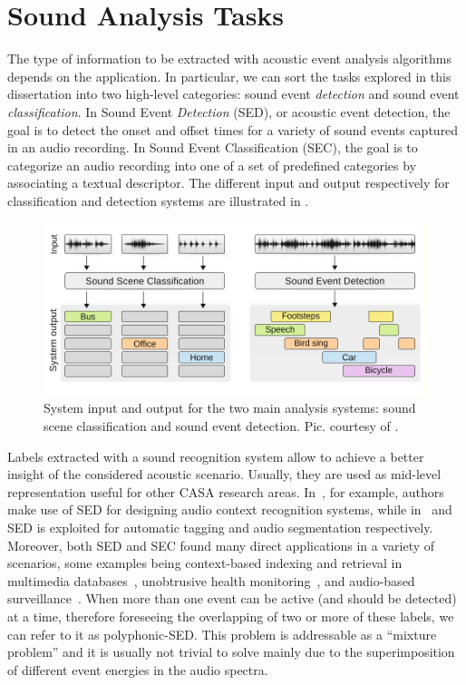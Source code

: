 \section{Sound Analysis Tasks}
The type of information to be extracted with acoustic event analysis algorithms depends on the application. In particular, we can sort the tasks explored in this dissertation into two high-level categories: sound event \textit{detection} and sound event \textit{classification}.
In Sound Event \textit{Detection} (SED), or acoustic event detection, the goal is to detect the onset and offset times for a variety of sound events captured in an audio recording. 
In Sound Event Classification (SEC), the goal is to categorize an audio recording into one of a set of predefined categories by associating a textual descriptor. The different input and output respectively for classification and detection systems are illustrated in .


\begin{figure}[h]
	\centering
	\includegraphics[width=\linewidth]{img/sed_sec.pdf}
	\caption[System input and output ]{System input and output for the two main analysis systems: sound scene classification and sound event detection. Pic. courtesy of \cite{virtanen2018computational}.}
	\label{fig:system-io}
\end{figure}

Labels extracted with a sound recognition system allow to achieve a better insight of the considered acoustic scenario. Usually, they are used as mid-level representation useful for other CASA research areas. In~\cite{chu2009environmental, heittola2010audio}, for example, authors make use of SED for designing audio context recognition systems, while in~\cite{shah2012lifelogging} and~\cite{wichern2010segmentation} SED is exploited for automatic tagging and audio segmentation respectively. Moreover, both SED and SEC found many direct applications in a variety of scenarios, some examples being context-based indexing and retrieval in multimedia databases~\cite{xu2008audio}, unobtrusive health monitoring~\cite{peng2009healthcare}, and audio-based surveillance~\cite{harma2005automatic, crocco2016audio, Principi2016a}. When more than one event can be active (and should be detected) at a time, therefore foreseeing the overlapping of two or more of these labels, we can refer to it as polyphonic-SED.
This problem is addressable as a ``mixture problem'' and it is usually not trivial to solve mainly due to the superimposition of different event energies in the audio spectra.

